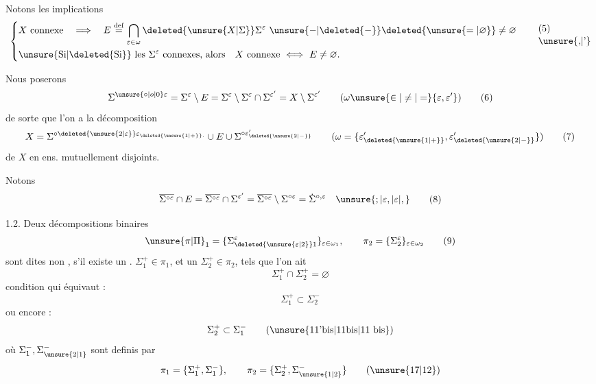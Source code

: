 \begingroup
\makeatletter\tagsleft@true\makeatother
Notons les implications
\[
\left\{\begin{aligned}
&X\ \text{connexe}\quad\Longrightarrow\quad E\overset{\mathrm{def}}{=}\bigcap_{\varepsilon\in\omega}\deleted{\unsure{X|\Sigma}}\Sigma^\varepsilon\ \unsure{-|\deleted{-}}\deleted{\unsure{=|\varnothing}}\ne\varnothing\\
&\text{\unsure{Si|\deleted{Si}} les }\Sigma^\varepsilon\ \text{connexes, alors}\quad X\ \text{connexe}\ \Longleftrightarrow\ E\ne\varnothing.
\end{aligned}\right.\tag*{\shortstack[l]{(5)\\\unsure{,|'}}}
\]

Nous poserons
\[
\Sigma^{\unsure{\circ|o|0}\varepsilon}=\Sigma^\varepsilon\setminus E=\Sigma^\varepsilon\setminus\Sigma^\varepsilon\cap\Sigma^{\varepsilon'}=X\setminus\Sigma^{\varepsilon'}\qquad(\omega\unsure{\in|\ne|=}\{\varepsilon,\varepsilon'\})\tag*{(6)}
\]
de sorte que l'on a la décomposition
\[
X=\Sigma^{\circ\deleted{\unsure{2|\varepsilon}}\varepsilon_{\deleted{\unsure{1|+}}.}}\cup E\cup\Sigma^{\circ\varepsilon'_{\deleted{\unsure{2|-}}}}\qquad(\omega=\{\varepsilon'_{\deleted{\unsure{1|+}}},\varepsilon'_{\deleted{\unsure{2|-}}}\})\tag*{(7)}
\]
de $X$ en  ens. mutuellement disjoints.

Notons
\[
\overline{\Sigma^{\circ\varepsilon}}\cap E=\overline{\Sigma^{\circ\varepsilon}}\cap\Sigma^{\varepsilon'}=\overline{\Sigma^{\circ\varepsilon}}\setminus\Sigma^{\circ\varepsilon}=\dot{\Sigma}^{\circ,\varepsilon}\quad\unsure{;|\varepsilon,|\varepsilon|,}\tag*{(8)}
\]

\par
{}

1.2. Deux décompositions binaires
\[
\unsure{\pi|\Pi}_1=\{\Sigma_{\deleted{\unsure{\varepsilon|2}}1}^\varepsilon\}_{\varepsilon\in\omega_1},\qquad\pi_2=\{\Sigma_2^\varepsilon\}_{\varepsilon\in\omega_2}\tag*{(9)}
\]
sont dites non \uline{},  s'il existe un . $\Sigma_1^+\in\pi_1$, et un $\Sigma_2^+\in\pi_2$, tels que l'on ait
\[
\Sigma_1^+\cap\Sigma_2^+=\varnothing\tag*{(10)}
\]
condition qui équivaut :
\[
\Sigma_1^+\subset\Sigma_2^-\tag*{(11)}
\]
ou encore :
\[
\Sigma_2^+\subset\Sigma_1^-\tag*{(\unsure{11'bis|11bis|11 bis})}
\]
où $\Sigma_1^-,\Sigma_{\unsure{2|1}}^-$ sont definis par
\[
\pi_1=\{\Sigma_1^+,\Sigma_1^-\},\qquad\pi_2=\{\Sigma_2^+,\Sigma_{\unsure{1|2}}^-\}\tag*{(\unsure{17|12})}
\]
\endgroup
